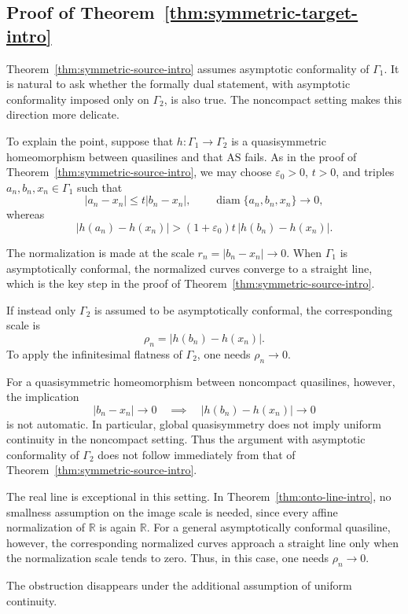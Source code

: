 \documentclass[11pt]{amsart}
\numberwithin{equation}{section}
\theoremstyle{definition} %
\theoremstyle{remarkstyle}
\newcommand{\R}{\mathbb{R}}
\newcommand{\diam}{\operatorname{diam}}
\begin{document}
\subsection{Proof of Theorem~\ref{thm:symmetric-target-intro}}

Theorem~\ref{thm:symmetric-source-intro} assumes asymptotic conformality of $\Gamma_1$.  
It is natural to ask whether the formally dual statement, with asymptotic conformality imposed only on $\Gamma_2$, is also true.  
The noncompact setting makes this direction more delicate.

To explain the point, suppose that $h\colon \Gamma_1 \to \Gamma_2$ is a quasisymmetric homeomorphism between quasilines and that $\mathrm{AS}$ fails.
As in the proof of Theorem~\ref{thm:symmetric-source-intro}, we may choose $\varepsilon_0>0$, $t>0$, and triples $a_n,b_n,x_n\in\Gamma_1$ such that
\[
 |a_n-x_n|\leq t|b_n-x_n|,\qquad \diam\{a_n,b_n,x_n\}\to 0,
\]
whereas
\[
 |h(a_n)-h(x_n)| >(1+\varepsilon_0)t\,|h(b_n)-h(x_n)|.
\]

The normalization is made at the scale $r_n=|b_n-x_n|\to0$.  
When $\Gamma_1$ is asymptotically conformal, the normalized curves converge to a straight line, which is the key step in the proof of Theorem~\ref{thm:symmetric-source-intro}.

If instead only $\Gamma_2$ is assumed to be asymptotically conformal, the
corresponding scale is
\[
 \rho_n=|h(b_n)-h(x_n)|.
\]
To apply the infinitesimal flatness of $\Gamma_2$, one needs $\rho_n\to 0$.

For a quasisymmetric homeomorphism  between noncompact quasilines, however, the implication
\[
 |b_n-x_n|\to 0\quad\implies\quad|h(b_n)-h(x_n)|\to 0
\]
is not automatic.  
In particular, global quasisymmetry does not imply uniform continuity in the noncompact setting.  
Thus the argument with asymptotic conformality of $\Gamma_2$ does not follow immediately from that of Theorem~\ref{thm:symmetric-source-intro}.

The real line is exceptional in this setting.  
In Theorem~\ref{thm:onto-line-intro}, no smallness assumption on the image scale is needed, since every affine normalization of $\R$ is again $\R$.  
For a general asymptotically conformal quasiline, however, the corresponding normalized curves approach a straight line only when the normalization scale tends to zero.  
Thus, in this case, one needs $\rho_n\to0$.

The obstruction disappears under the additional assumption of uniform continuity.
\end{document}
